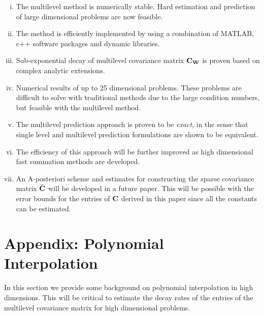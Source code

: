 \documentclass[11pt,final]{amsart}       %
\begin{document}
\begin{enumerate}[i)]

\item The multilevel method is numerically stable. Hard estimation and
  prediction of large dimensional problems are now feasible.
  
\item The method is efficiently implemented by using a combination of
  MATLAB, c++ software packages and dynamic libraries.

\item Sub-exponential decay of multilevel covariance matrix
  $\mathbf{C}_{\mathbf{W}}$ is proven based on complex analytic extensions.
  
\item Numerical results of up to 25 dimensional problems. These
  problems are difficult to solve with traditional methods due to the
  large condition numbers, but feasible with the multilevel method.

\item The multilevel prediction approach is proven to be \emph{exact},
  in the sense that single level and multilevel prediction
  formulations are shown to be equivalent. 
   

\item The efficiency of this approach will be further improved as high
  dimensional fast summation methods are developed.

\item An A-posteriori scheme and estimates for constructing the sparse
  covariance matrix $\tilde {\mathbf{C}}$ will be developed in a future
  paper. This will be possible with the error bounds for the entries
  of $\mathbf{C}$ derived in this paper since all the constants can be
  estimated.

  
\end{enumerate}














\section*{Appendix: Polynomial Interpolation}
\label{PolynomialAppendix}

In this section we provide some background on polynomial interpolation
in high dimensions. This will be critical to estimate the decay rates
of the entries of the multilevel covariance matrix for high
dimensional problems.
\end{document}
